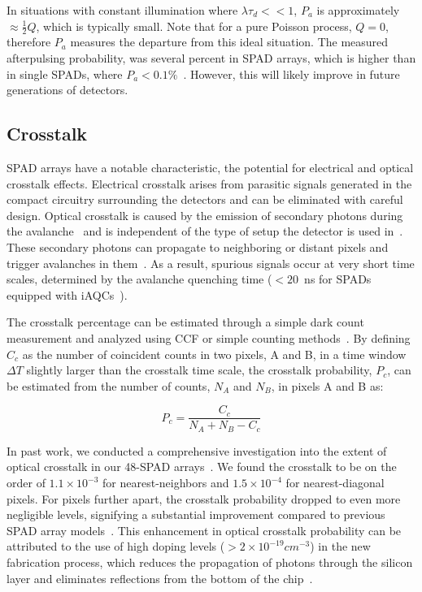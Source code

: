 \noindent
In situations with constant illumination where $\lambda \tau_d << 1$, $P_a$ is approximately $\approx \frac{1}{2}Q$, which is typically small. 
Note that for a pure Poisson process, $Q = 0$, therefore $P_a$ measures the departure from this ideal situation. 
The measured afterpulsing probability, was several percent in \ac{SPAD} arrays, which is higher than in single \ac{SPAD}s, where $P_a<0.1\%$~\cite{ingargiola_PLOS1_2016}. 
However, this will likely improve in future generations of detectors.

\subsection{Crosstalk}
\label{sec:crosstalk}

\ac{SPAD} arrays have a notable characteristic, the potential for electrical and optical crosstalk effects. 
Electrical crosstalk arises from parasitic signals generated in the compact circuitry surrounding the detectors and can be eliminated with careful design. 
Optical crosstalk is caused by the emission of secondary photons during the avalanche~\cite{spitzer_PR_1957} and is independent of the type of setup the detector is used in~\cite{bude_PRBC_1992,lacaita_IEEE_1993}. 
These secondary photons can propagate to neighboring or distant pixels and trigger avalanches in them~\cite{rech_OE_2008}. 
As a result, spurious signals occur at very short time scales, determined by the avalanche quenching time ($< 20$~ns for \ac{SPAD}s equipped with \ac{iAQC}s~\cite{gallivanoni_IEEETNS_2010}).

The crosstalk percentage can be estimated through a simple dark count measurement and analyzed using \ac{CCF} or simple counting methods~\cite{restelli_JMO_2007,ingargiola_PLOS1_2016,ingargiola_NIMA_2018}. 
By defining $C_c$ as the number of coincident counts in two pixels, A and B, in a time window $\Delta T$ slightly larger than the crosstalk time scale, the crosstalk probability, $P_c$, can be estimated from the number of counts, $N_A$ and $N_B$, in pixels A and B as:

\begin{equation}
\label{eqn:Pc}
P_c=\frac{C_c}{N_A+N_B-C_c}
\end{equation}

In past work, we conducted a comprehensive investigation into the extent of optical crosstalk in our 48-\ac{SPAD} arrays~\cite{ingargiola_NIMA_2018}. 
We found the crosstalk to be on the order of $1.1\times 10^{-3}$ for nearest-neighbors and $1.5\times 10^{-4}$ for nearest-diagonal pixels.
For pixels further apart, the crosstalk probability dropped to even more negligible levels, signifying a substantial improvement compared to previous \ac{SPAD} array models~\cite{ingargiola_PLOS1_2016}. 
This enhancement in optical crosstalk probability can be attributed to the use of high doping levels ($> 2\times 10^{-19} cm^{-3}$) in the new fabrication process, which reduces the propagation of photons through the silicon layer and eliminates reflections from the bottom of the chip~\cite{spitzer_PR_1957}.

